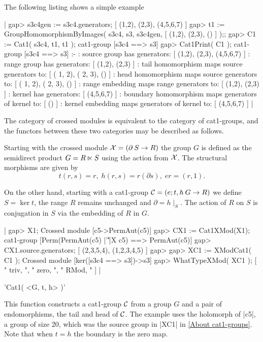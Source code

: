 The following listing shows a simple example\:

|    gap> s3c4gen := s3c4.generators;
    [ (1,2), (2,3), (4,5,6,7) ]
    gap> t1 := GroupHomomorphismByImages( s3c4, s3, s3c4gen,
          [ (1,2), (2,3), () ] );;
    gap> C1 := Cat1( s3c4, t1, t1 );
    cat1-group [s3c4 ==> s3] 
    gap> Cat1Print( C1 );
    cat1-group [s3c4 ==> s3] :- 
    : source group has generators:
      [ (1,2), (2,3), (4,5,6,7) ]
    :  range group has generators:
      [ (1,2), (2,3) ]
    : tail homomorphism maps source generators to:
      [ ( 1, 2), ( 2, 3), () ]
    : head homomorphism maps source generators to:
      [ ( 1, 2), ( 2, 3), () ]
    : range embedding maps range generators to:
      [ (1,2), (2,3) ]
    : kernel has generators:
      [ (4,5,6,7) ]
    : boundary homomorphism maps generators of kernel to:
      [ () ]
    : kernel embedding maps generators of kernel to:
      [ (4,5,6,7) ]  |

The category of crossed modules is equivalent to the category of cat1-groups,
and the functors between these two categories may be described as follows.

Starting with the crossed module 
${\cal X} = (\partial \: S \to R)$ the group $ G $ is defined 
as the semidirect product $ G = R \semidirect S$
using the action from  ${\cal X}$.
The structural morphisms are given by
$$
t(r,s) = r, \; h(r,s) = r (\partial s), \; er = (r,1).
$$

On the other hand, starting with a cat1-group 
$ {\cal C} = (e;t,h \: G \to R)$  we define 
$ S = \ker t$, the range $R$ remains unchanged and 
$ \partial = h\mid_S $.
The action of  $R$  on  $S$  is conjugation in  $S$  via the embedding
of  $R$  in  $G$.

|    gap> X1;
    Crossed module [c5->PermAut(c5)]
    gap> CX1 := Cat1XMod(X1);
    cat1-group [Perm(PermAut(c5) |'\|'|X c5) ==> PermAut(c5)] 
    gap> CX1.source.generators;
    [ (2,3,5,4), (1,2,3,4,5) ]
    gap>
    gap> XC1 := XModCat1( C1 );
    Crossed module [ker([s3c4 ==> s3])->s3]
    gap> WhatTypeXMod( XC1 );
    [ " triv, ", " zero, ", " RMod, " ]  |


%

'Cat1( <G, t, h> )'

This function constructs a cat1-group ${\cal C}$ from a group $G$ 
and a pair of endomorphisms, the tail and head of ${\cal C}$.
The example uses the holomorph of |c5|, a group of size 20,
which was the source group in |XC1| in \ref{About cat1-groups}.
Note that when $t = h$ the boundary is the zero map.

